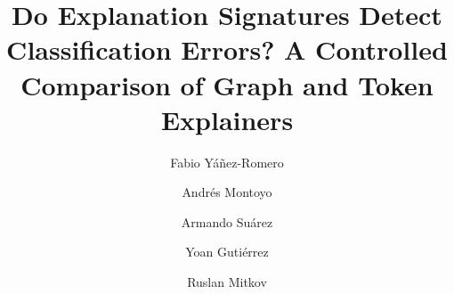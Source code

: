 \documentclass[preprint, times, review, 10pt]{elsarticle}
\begin{document}
\begin{frontmatter}

\title{Do Explanation Signatures Detect Classification Errors? A Controlled Comparison of Graph and Token Explainers}


\author[add1,orcid=0009-0005-5494-0166]{Fabio Yáñez-Romero}

\author[add2,orcid=0000-0002-3076-0890]{Andrés Montoyo}

\author[add2,orcid=0000-0002-8590-3000]{Armando Suárez}

\author[add2,orcid=0000-0002-4052-7427]{Yoan Gutiérrez}

\author[add3,orcid=0000-0003-2522-066X]{Ruslan Mitkov}

\address[add1]{University Institute for Computer Research, University of Alicante, Carretera San Vicente del Raspeig s/n, 03690 San Vicente del Raspeig, Alicante, Spain}
\address[add2]{Department of Computing Information Systems, University of Alicante, Carretera San Vicente del Raspeig s/n, 03690 San Vicente del Raspeig, Alicante, Spain}
\address[add3]{Lancaster University, Bailrigg, Lancaster, LA1 4YW, United Kingdom}




\end{frontmatter}
\end{document}
